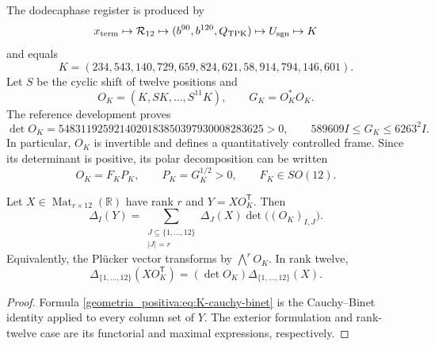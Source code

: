 The dodecaphase register is produced by
\[
 x_{\rm term}\mapsto\mathcal R_{12}
 \mapsto(b^{90},b^{120},Q_{\rm TPK})
 \mapsto U_{\rm sgn}\mapsto K
\]
and equals
\[
 K=(234,543,140,729,659,824,621,58,914,794,146,601).
\]
Let \(S\) be the cyclic shift of twelve positions and
\[
 O_K=(K,SK,\ldots,S^{11}K),\qquad G_K=O_K^*O_K.
\]
The reference development proves
\begin{equation}
 \det O_K=5483119259214020183850397930008283625>0,
 \qquad
 589609I\le G_K\le6263^2I.
 \label{geometria_positiva:eq:K-frame-bounds}
\end{equation}
In particular, \(O_K\) is invertible and defines a quantitatively controlled frame. Since its determinant is positive, its polar decomposition can be written
\[
 O_K=F_KP_K,\qquad P_K=G_K^{1/2}>0,\qquad F_K\in SO(12).
\]

\begin{proposition}
\label{geometria_positiva:thm:K-plucker-transport} Let \(X\in\operatorname{Mat}_{r\times12}(\mathbb R)\) have rank \(r\) and \(Y=XO_K^{\mathsf T}\). Then
\begin{equation}
 \Delta_I(Y)=
 \sum_{\substack{J\subseteq\{1,\ldots,12\}\\ |J|=r}}
 \Delta_J(X)\det\!\bigl((O_K)_{I,J}\bigr).
 \label{geometria_positiva:eq:K-cauchy-binet}
\end{equation}
Equivalently, the Plücker vector transforms by \(\bigwedge^rO_K\). In rank twelve,
\[
 \Delta_{\{1,\ldots,12\}}(XO_K^{\mathsf T})
 =(\det O_K)\Delta_{\{1,\ldots,12\}}(X).
\]
\end{proposition}
\begin{proof}
Formula \eqref{geometria_positiva:eq:K-cauchy-binet} is the Cauchy--Binet identity applied to every column set of \(Y\). The exterior formulation and rank-twelve case are its functorial and maximal expressions, respectively.
\end{proof}


